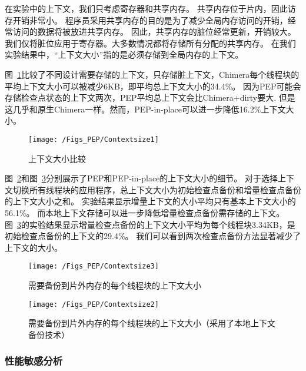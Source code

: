 在实验中的上下文，我们只考虑寄存器和共享内存。
共享内存位于片内，因此访存开销非常小。
程序员采用共享内存的目的是为了减少全局内存访问的开销，经常访问的数据将被放进共享内存。
因此，共享内存的脏位经常更新，开销较大。
我们仅将脏位应用于寄存器。大多数情况都将存储所有分配的共享内存。
在我们实验结果中，``上下文大小''指的是必须存储到全局内存的上下文。

图~\ref{fig:Contextsize1}比较了不同设计需要存储的上下文，只存储脏上下文，Chimera每个线程块的平均上下文大小可以被减少6KB，即平均总上下文大小的34.4\%。
因为PEP可能会存储检查点状态的上下文两次，PEP平均总上下文会比Chimera+dirty要大.
但是这几乎和原生Chimera一样。然而，PEP-in-place可以进一步降低16.2\%上下文大小。

\begin{figure}[htbp] %
  \centering
  \texttt{[image: /Figs\_PEP/Contextsize1]}
  \caption{上下文大小比较}
  \label{fig:Contextsize1}
\end{figure}



图~\ref{fig:Contextsize3}和图~\ref{fig:Contextsize2}分别展示了PEP和PEP-in-place的上下文大小的细节。
对于选择上下文切换所有线程块的应用程序，总上下文大小为初始检查点备份和增量检查点备份的上下文大小之和。
实验结果显示增量上下文的大小平均只有基本上下文大小的56.1\%。
而本地上下文存储可以进一步降低增量检查点备份需存储的上下文。
图~\ref{fig:Contextsize2}的实验结果显示增量检查点备份的上下文大小平均为每个线程块3.34KB，是初始检查点备份的上下文的29.4\%。
我们可以看到两次检查点备份方法显著减少了上下文的大小。

\begin{figure}[htbp] %
  \centering
  \texttt{[image: /Figs\_PEP/Contextsize3]}
  \caption{需要备份到片外内存的每个线程块的上下文大小}
  \label{fig:Contextsize3}
\end{figure}

\begin{figure}[htbp] %
  \centering
  \texttt{[image: /Figs\_PEP/Contextsize2]}
  \caption{需要备份到片外内存的每个线程块的上下文大小（采用了本地上下文备份技术）}
  \label{fig:Contextsize2}
\end{figure}



\subsubsection{性能敏感分析}


